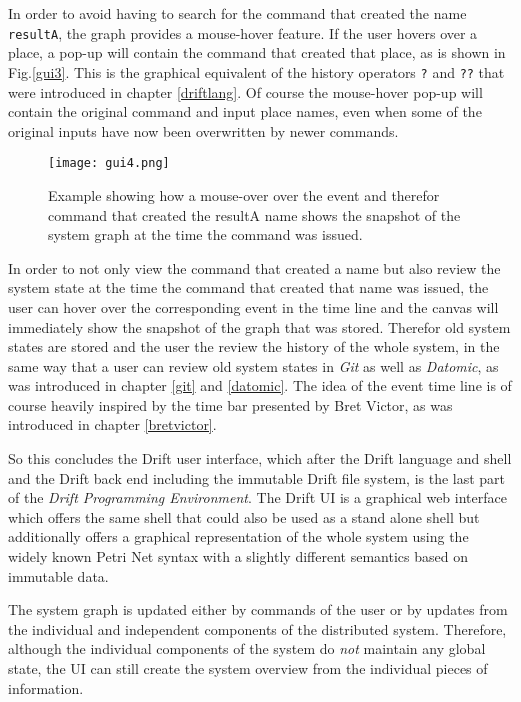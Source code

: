 In order to avoid having to search for the command that created
the name \texttt{resultA}, the graph provides a mouse-hover feature.
If the user hovers over a place, a pop-up will contain the command that
created that place, as is shown in Fig.\ref{gui3}. This is the graphical
equivalent of the history operators \texttt{?} and \texttt{??}
that were introduced in chapter \ref{driftlang}. Of course the
mouse-hover pop-up will contain the original command and input
place names, even when some of the original inputs have now been
overwritten by newer commands.

\begin{figure}[h]
  \texttt{[image: gui4.png]}
  \caption{Example showing how a mouse-over over the event
           and therefor command that created the resultA name
           shows the snapshot of the system graph at the time
           the command was issued.}
  \label{gui4}
\end{figure}

In order to not only view the command that created a name
but also review the system state at the time the command
that created that name was issued, the user can hover over
the corresponding event in the time line and the canvas
will immediately show the snapshot of the graph that was
stored. Therefor old system states are stored and the
user the review the history of the whole system, in the
same way that a user can review old system states in
\textit{Git} as well as \textit{Datomic}, as was introduced
in chapter \ref{git} and \ref{datomic}. The idea of the
event time line is of course heavily inspired by the
time bar presented by Bret Victor, as was introduced in
chapter \ref{bretvictor}.
\newline

So this concludes the Drift user interface, which after
the Drift language and shell and the Drift back end including
the immutable Drift file system, is the last part of the
\textit{Drift Programming Environment}. The Drift UI is
a graphical web interface which offers the same shell that
could also be used as a stand alone shell but additionally
offers a graphical representation of the whole system
using the widely known Petri Net syntax with a slightly
different semantics based on immutable data.

The system graph is updated either by commands of the
user or by updates from the individual and independent
components of the distributed system. Therefore,
although the individual components of the system do
\textit{not} maintain any global state, the UI can still
create the system overview from the individual pieces
of information.
